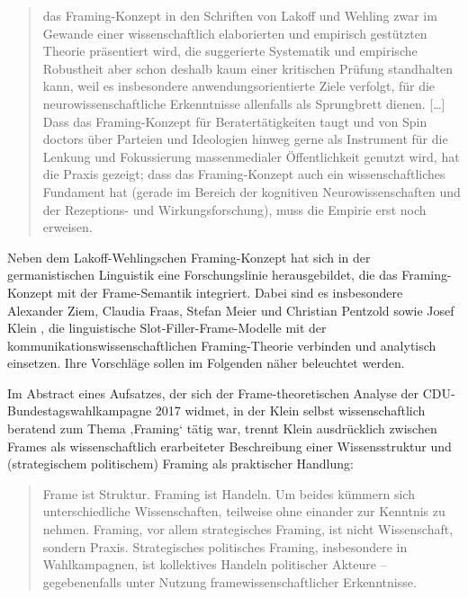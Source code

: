 \begin{quote}
das Framing-Konzept in den Schriften von Lakoff und Wehling zwar im Gewande einer wissenschaftlich elaborierten und empirisch gestützten Theorie präsentiert wird, die suggerierte Systematik und empirische Robustheit aber schon deshalb kaum einer kritischen Prüfung standhalten kann, weil es insbesondere anwendungsorientierte Ziele verfolgt, für die neurowissenschaftliche Erkenntnisse allenfalls als Sprungbrett dienen. {[}\ldots{]} Dass das Framing-Konzept für Beratertätigkeiten taugt und von Spin doctors über Parteien und Ideologien hinweg gerne als Instrument für die Lenkung und Fokussierung massenmedialer Öffentlichkeit genutzt wird, hat die Praxis gezeigt; dass das Framing-Konzept auch ein wissenschaftliches Fundament hat (gerade im Bereich der kognitiven Neurowissenschaften und der Rezeptions- und Wirkungsforschung), muss die Empirie erst noch erweisen. \autocite[74]{ziemFramingGeneseStruktur2022}
\end{quote}

Neben dem Lakoff-Wehlingschen Framing-Konzept hat sich in der germanistischen Linguistik eine Forschungslinie herausgebildet, die das Framing-Konzept mit der Frame-Semantik integriert. Dabei sind es insbesondere Alexander Ziem, Claudia Fraas, Stefan Meier und Christian Pentzold \autocite{ziemMedienFramesAlsSemantische2018, ziemFramesAlsPraedikations2014, fraasKonvergenzSchnittstellenUnterschiedlicher2010} sowie Josef Klein \autocite*{kleinFrameUndFraming2018}, die linguistische Slot-Filler-Frame-Modelle mit der kommunikationswissenschaftlichen Framing-Theorie verbinden und analytisch einsetzen. Ihre Vorschläge sollen im Folgenden näher beleuchtet werden.

Im Abstract eines Aufsatzes, der sich der Frame-theoretischen Analyse der CDU-Bundestagswahlkampagne 2017 widmet, in der Klein selbst wissenschaftlich beratend zum Thema ‚Framing` tätig war, trennt Klein ausdrücklich zwischen Frames als wissenschaftlich erarbeiteter Beschreibung einer Wissensstruktur und (strategischem politischem) Framing als praktischer Handlung:

\begin{quote}
Frame ist Struktur. Framing ist Handeln. Um beides kümmern sich unterschiedliche Wissenschaften, teilweise ohne einander zur Kenntnis zu nehmen. Framing, vor allem strategisches Framing, ist nicht Wissenschaft, sondern Praxis. Strategisches politisches Framing, insbesondere in Wahlkampagnen, ist kollektives Handeln politischer Akteure -- gegebenenfalls unter Nutzung framewissenschaftlicher Erkenntnisse. \autocite[289]{kleinFrameUndFraming2018}
\end{quote}

